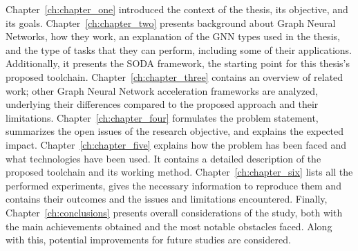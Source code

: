 Chapter~\ref{ch:chapter_one} introduced the context of the thesis, its objective, and its goals.
Chapter~\ref{ch:chapter_two} presents background about Graph Neural Networks, how they work, an explanation of the GNN types used in the thesis, and the type of tasks that they can perform, including some of their applications.
Additionally, it presents the SODA framework, the starting point for this thesis's proposed toolchain.
Chapter~\ref{ch:chapter_three} contains an overview of related work; other Graph Neural Network acceleration frameworks are analyzed, underlying their differences compared to the proposed approach and their limitations.
Chapter~\ref{ch:chapter_four} formulates the problem statement, summarizes the open issues of the research objective, and explains the expected impact.
Chapter~\ref{ch:chapter_five} explains how the problem has been faced and what technologies have been used.
It contains a detailed description of the proposed toolchain and its working method.
Chapter~\ref{ch:chapter_six} lists all the performed experiments, gives the necessary information to reproduce them and contains their outcomes and the issues and limitations encountered.
Finally, Chapter~\ref{ch:conclusions} presents overall considerations of the study, both with the main achievements obtained and the most notable obstacles faced.
Along with this, potential improvements for future studies are considered.